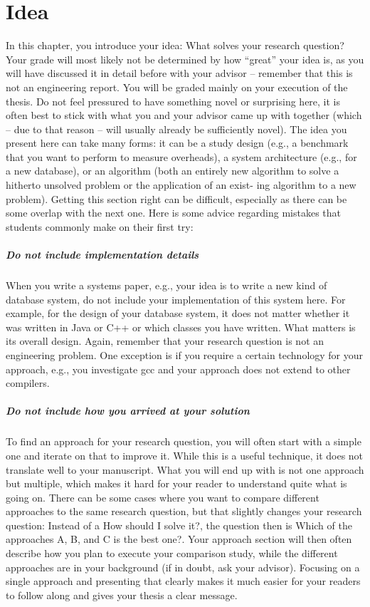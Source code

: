 \chapter{Idea}\label{ch:Idea}
In this chapter, you introduce your idea: What solves your research question?
Your grade will most likely not be determined by how “great” your idea is, as you will have discussed it in detail before with your advisor – remember that this is not an engineering report. You will be graded mainly on your execution of the thesis. Do not feel pressured to have something novel or surprising here, it is often best to stick with what you and your advisor came up with together (which – due to that reason – will usually already be sufficiently novel).
The idea you present here can take many forms: it can be a study design (e.g., a benchmark that you want to perform to measure overheads), a system architecture (e.g., for a new database), or an algorithm (both an entirely new algorithm to solve a hitherto unsolved problem or the application of an exist- ing algorithm to a new problem).
Getting this section right can be difficult, especially as there can be some overlap with the next one.
Here is some advice regarding mistakes that students commonly make on their first try:

\paragraph{Do not include implementation details} When you write a systems paper, e.g., your idea is to write a new kind of database system, do not include your implementation of this system here. For example, for the design of your database system, it does not matter whether it was written in Java or C++ or which classes you have written. What matters is its overall design. Again, remember that your research question is not an engineering problem. One exception is if you require a certain technology for your approach, e.g., you investigate gcc and your approach does not extend to other compilers.

\paragraph{Do not include how you arrived at your solution} To find an approach for your research question, you will often start with a simple one and iterate on that to improve it. While this is a useful technique, it does not translate well to your manuscript. What you will end up with is not one approach but multiple, which makes it hard for your reader to understand quite what is going on. There can be some cases where you want to compare different approaches to the same research question, but that slightly changes your research question: Instead of a How should I solve it?, the question then is Which of the approaches A, B, and C is the best one?. Your approach section will then often describe how you plan to execute your comparison study, while the different approaches are in your background (if in doubt, ask your advisor). Focusing on a single approach and presenting that clearly makes it much easier for your readers to follow along and gives your thesis a clear message.


